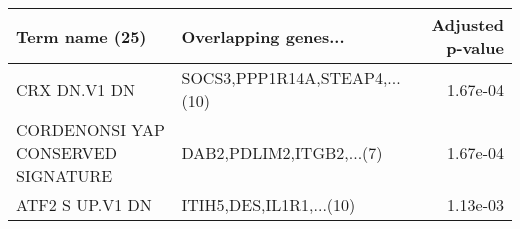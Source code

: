 \begin{tabular}{llr}
\toprule
                    Term name (25) &          Overlapping genes... &  Adjusted p-value \\
\midrule
                      CRX DN.V1 DN & SOCS3,PPP1R14A,STEAP4,...(10) &          1.67e-04 \\
CORDENONSI YAP CONSERVED SIGNATURE &      DAB2,PDLIM2,ITGB2,...(7) &          1.67e-04 \\
                   ATF2 S UP.V1 DN &       ITIH5,DES,IL1R1,...(10) &          1.13e-03 \\
\bottomrule
\end{tabular}
